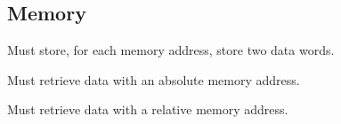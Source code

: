 \subsection{Memory}

\begin{feat-requirement}
Must store, for each memory address, store two data words. 
\end{feat-requirement}

\begin{feat-requirement}
Must retrieve data with an absolute memory address. 
\end{feat-requirement}

\begin{feat-requirement}
Must retrieve data with a relative memory address. 
\end{feat-requirement}
